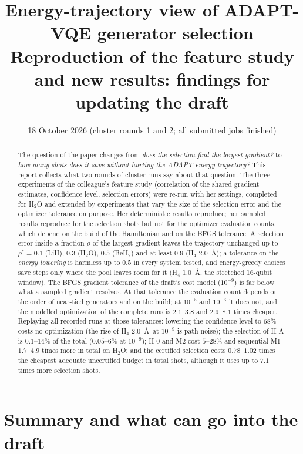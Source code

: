 \documentclass[11pt]{article}
\title{Energy-trajectory view of ADAPT-VQE generator selection\\[2pt]
\large Reproduction of the feature study and new results: findings for updating the draft}
\date{18 October 2026 (cluster rounds 1 and 2; all submitted jobs finished)}
\begin{document}
\maketitle

\begin{abstract}
\noindent
The question of the paper changes from \emph{does the selection find the largest gradient?} to \emph{how many shots does it save without hurting the ADAPT energy trajectory?}
This report collects what two rounds of cluster runs say about that question. The three experiments of the colleague's feature study (correlation of the shared gradient estimates,
confidence level, selection errors) were re-run with her settings, completed for H$_2$O and extended by experiments that vary the size of the selection error and the optimizer tolerance on purpose.
Her deterministic results reproduce; her sampled results reproduce for the selection shots but not for the optimizer evaluation counts, which depend on the build of the Hamiltonian and
on the BFGS tolerance. A selection error inside a fraction $\rho$ of the largest gradient leaves the trajectory unchanged up to $\rho^\ast=0.1$ (LiH), $0.3$ (H$_2$O), $0.5$ (BeH$_2$)
and at least $0.9$ (H$_4$ 2.0~\AA); a tolerance on the \emph{energy lowering} is harmless up to $0.5$ in every system tested, and energy-greedy choices save steps only where the pool leaves room for it (H$_4$ 1.0~\AA, the
stretched 16-qubit window).
The BFGS gradient tolerance of the draft's cost model ($10^{-9}$) is far below what a sampled gradient resolves. At that tolerance the evaluation count depends on the order of near-tied generators and on the build; at $10^{-5}$ and $10^{-3}$ it does not, and the modelled optimization of the complete runs is $2.1$--$3.8$ and $2.9$--$8.1$ times cheaper.
Replaying all recorded runs at those tolerances: lowering the confidence level to 68\% costs no optimization (the rise of H$_4$ 2.0~\AA\ at $10^{-9}$ is path noise); the selection of II-A is $0.1$--$14\%$ of the total ($0.05$--$6\%$ at $10^{-9}$); II-0 and M2 cost $5$--$28\%$ and sequential M1 $1.7$--$4.9$ times more in total on H$_2$O; and the certified selection costs $0.78$--$1.02$ times the cheapest adequate uncertified budget in total shots, although it uses up to $7.1$ times more selection shots.
\end{abstract}

\tableofcontents

\section{Summary and what can go into the draft}
\end{document}
